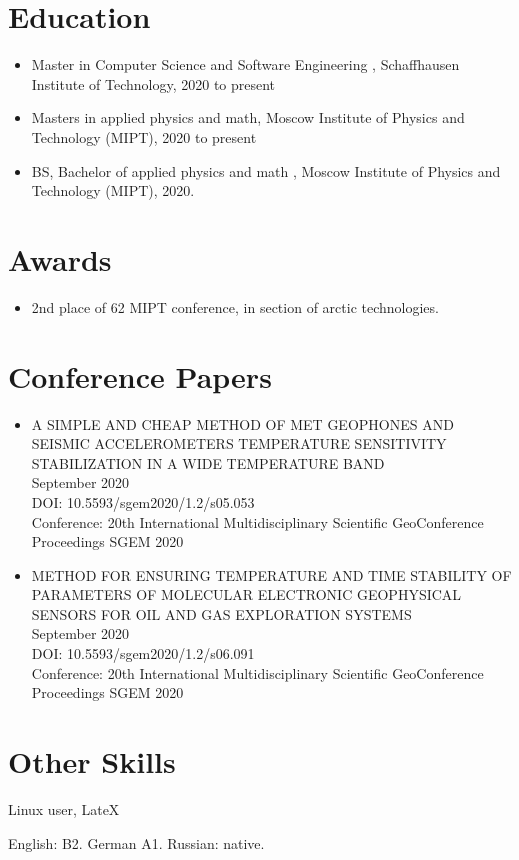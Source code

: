 \documentclass{article}
\begin{document}
\section{Education}

\begin{itemize}
\item Master in Computer Science and Software Engineering , Schaffhausen Institute of Technology, 2020 to present
\item Masters in applied physics and math, Moscow Institute of Physics and Technology (MIPT), 2020 to present
\item BS, Bachelor of applied physics and math , Moscow Institute of Physics and Technology (MIPT), 2020.
\end{itemize}


\section{Awards}
\begin{itemize}
\item 2nd place of 62 MIPT conference, in section of arctic technologies.
\end{itemize}

\section{Conference Papers }

\begin{itemize}
\item A SIMPLE AND CHEAP METHOD OF MET GEOPHONES AND SEISMIC ACCELEROMETERS TEMPERATURE SENSITIVITY STABILIZATION IN A WIDE TEMPERATURE BAND \\
September 2020 \\
DOI: 10.5593/sgem2020/1.2/s05.053 \\
Conference: 20th International Multidisciplinary Scientific GeoConference Proceedings SGEM 2020
\item  METHOD FOR ENSURING TEMPERATURE AND TIME STABILITY OF PARAMETERS OF MOLECULAR ELECTRONIC GEOPHYSICAL SENSORS FOR OIL AND GAS EXPLORATION SYSTEMS\\
September 2020 \\
DOI: 10.5593/sgem2020/1.2/s06.091 \\
Conference: 20th International Multidisciplinary Scientific GeoConference Proceedings SGEM 2020
\end{itemize}


\section{Other Skills}
\begin{description}[widest=Langauges]
\item[Software]	Linux user, LateX
\item[Languages]	English: B2. German A1. Russian: native.

\end{description}
\end{document}
